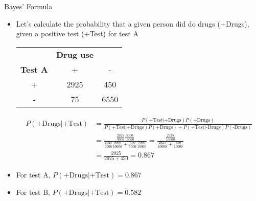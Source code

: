 \documentclass[xcolor=dvipsnames]{beamer}
\begin{document}
\begin{frame}{Bayes' Formula}
\begin{itemize}
	\item Let's calculate the probability that a given person did do drugs ($+$Drugs), given a positive test ($+$Test) for test A
	\begin{center}
		\begin{tabular}{c|cc}
			& \textbf{Drug use} & \\
			\textbf{Test A} & + & - \\ \hline
			+ & 2925 & 450 \\
			- & 75 & 6550\\
		\end{tabular}
	\end{center}
{\scriptsize
\begin{align*}
P(\text{+Drugs}|\text{+Test}) &= \frac{P(\text{+Test}|+\text{Drugs}) P(\text{+Drugs})}{P(\text{+Test}|\text{+Drugs}) P(\text{+Drugs}) + P(\text{+Test}|\text{-Drugs}) P(\text{-Drugs})} \\
&= \frac{\frac{2925}{3000} \frac{3000}{10000}}{\frac{2925}{3000} \frac{3000}{10000} + \frac{450}{7000}\frac{7000}{10000}} = \frac{\frac{2925}{10000}}{\frac{2925}{10000}+\frac{450}{10000}} \\
&= \frac{2925}{2925 + 450} = 0.867
\end{align*}
}
\item For test A, $P(\text{+Drugs}|\text{+Test}) = 0.867$
\item For test B, $P(\text{+Drugs}|\text{+Test}) = 0.582$ 
\end{itemize}
\end{frame}
\end{document}
